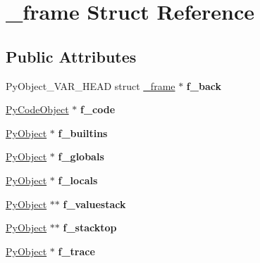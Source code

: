 \hypertarget{struct__frame}{}\section{\+\_\+frame Struct Reference}
\label{struct__frame}
\subsection*{Public Attributes}
\begin{DoxyCompactItemize}
\item 
Py\+Object\+\_\+\+V\+A\+R\+\_\+\+H\+E\+AD struct \hyperlink{struct__frame}{\+\_\+frame} $\ast$ {\bfseries f\+\_\+back}\hypertarget{struct__frame_a92f0794bfa51e632b26c92e197051051}{}\label{struct__frame_a92f0794bfa51e632b26c92e197051051}

\item 
\hyperlink{structPyCodeObject}{Py\+Code\+Object} $\ast$ {\bfseries f\+\_\+code}\hypertarget{struct__frame_a6c43e49e9a1dda4b0da3b584e94213f0}{}\label{struct__frame_a6c43e49e9a1dda4b0da3b584e94213f0}

\item 
\hyperlink{struct__object}{Py\+Object} $\ast$ {\bfseries f\+\_\+builtins}\hypertarget{struct__frame_aef7749f09670f4ef49043aa80261a96f}{}\label{struct__frame_aef7749f09670f4ef49043aa80261a96f}

\item 
\hyperlink{struct__object}{Py\+Object} $\ast$ {\bfseries f\+\_\+globals}\hypertarget{struct__frame_a7a3f5887fbfe5790091cd54e032d54db}{}\label{struct__frame_a7a3f5887fbfe5790091cd54e032d54db}

\item 
\hyperlink{struct__object}{Py\+Object} $\ast$ {\bfseries f\+\_\+locals}\hypertarget{struct__frame_a723e1f7f21d8fd1bbf93dcad47e62f74}{}\label{struct__frame_a723e1f7f21d8fd1bbf93dcad47e62f74}

\item 
\hyperlink{struct__object}{Py\+Object} $\ast$$\ast$ {\bfseries f\+\_\+valuestack}\hypertarget{struct__frame_aa313524b8ea2f4cbfd9768f44557f8a1}{}\label{struct__frame_aa313524b8ea2f4cbfd9768f44557f8a1}

\item 
\hyperlink{struct__object}{Py\+Object} $\ast$$\ast$ {\bfseries f\+\_\+stacktop}\hypertarget{struct__frame_a57757e28548379cb1a3e6e82062a9fe5}{}\label{struct__frame_a57757e28548379cb1a3e6e82062a9fe5}

\item 
\hyperlink{struct__object}{Py\+Object} $\ast$ {\bfseries f\+\_\+trace}\hypertarget{struct__frame_a6daba36513c0e5e5c36ac9985f70c1a3}{}\label{struct__frame_a6daba36513c0e5e5c36ac9985f70c1a3}


\end{DoxyCompactItemize}
